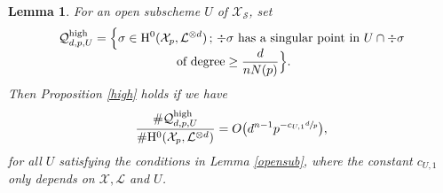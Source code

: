 \documentclass[JEP,XML,SOM,Unicode,published]{cedram}
\newcommand{\sep}{\,;\,}
\theoremstyle{plain}
\newtheorem{lem}[thm]{Lemma}
\theoremstyle{definition}
\newcommand{\ho}{\mathrm{H}}
\newcommand{\X}{\mathcal{X}}
\newcommand{\li}{\mathcal{L}}
\begin{document}
\begin{lem}\label{opensubworks}
For an open subscheme $U$ of $\X_\mathcal{S}$, set
\begin{multline*}
\mathcal{Q}^{\mathrm{high}}_{d,p,U}=\Bigl\{ \sigma\in \ho^0(\X_{p}, \li^{\otimes d})\sep \div \sigma \text{ has a singular point in } U\cap \div \sigma\\[-5pt] \text{ of degree}\geq \frac{d}{nN(p)}\Bigr\}.
\end{multline*}
Then Proposition \ref{high} holds if we have
\[
\frac{\#\mathcal{Q}_{d,p,U}^{\mathrm{high}}}{\#\ho^0(\X_{p}, \li^{\otimes d})}=O\bigl(d^{n-1}p^{-c_{U,1}\sfrac{d}{p}} \bigr),
\]
for all $U$ satisfying the conditions in Lemma \ref{opensub}, where the constant $c_{U,1}$ only depends on $\X,\li$ and $U$.
\end{lem}
\end{document}
